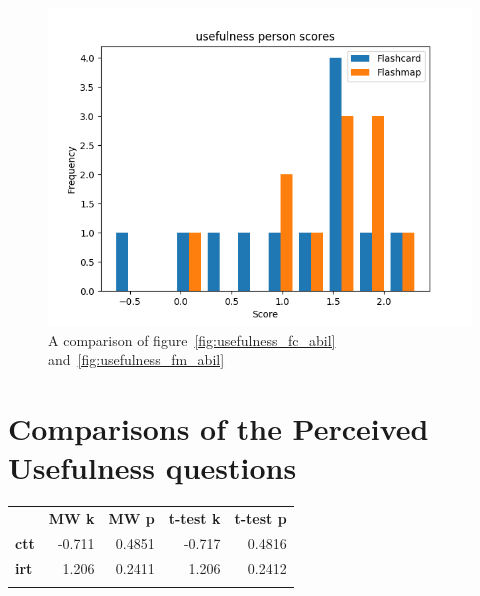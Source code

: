\begin{figure}
    \includegraphics[width=\textwidth]{img/usefulness_abil.png}
    \caption{A comparison of figure~\protect\ref{fig:usefulness_fc_abil} and~\protect\ref{fig:usefulness_fm_abil}}
    \label{fig:usefulness_abil}
\end{figure}

\FloatBarrier
\section{Comparisons of the Perceived Usefulness questions}

\begin{longtable}[c]{@{}lrrrr@{}}
\toprule\addlinespace
& \textbf{MW k} & \textbf{MW p} &
\textbf{t-test k} & \textbf{t-test p}
\\\addlinespace
\midrule
\textbf{ctt} & -0.711 & 0.4851 & -0.717 & 0.4816
\\\addlinespace
\textbf{irt} & 1.206 & 0.2411 & 1.206 & 0.2412
\\\addlinespace
\bottomrule
    \label{tab:easeofuse_comp}
\end{longtable}

